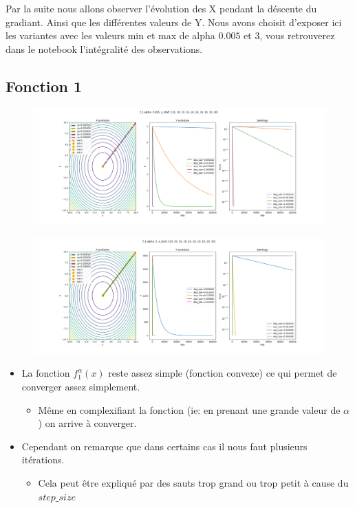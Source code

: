 \documentclass[twoside,10pt,a4paper]{article}
\numberwithin{equation}{section}					%
\numberwithin{figure}{section}						%
\begin{document}
Par la suite nous allons observer l'évolution des X pendant la déscente du gradiant. Ainsi que les différentes valeurs de Y.
Nous avons choisit d'exposer ici les variantes avec les valeurs min et max de alpha $0.005$ et $3$, vous retrouverez dans le notebook l'intégralité des observations.

\subsection{Fonction 1 }\label{sec:subsection2}
\begin{figure}[H]
    \centering
    \includegraphics[width=\textwidth]{imgs/fixed_sz/f_1_a-0.005_fixed_sz.png}
    \caption{}
\end{figure}
\begin{figure}[H]
    \centering
    \includegraphics[width=\textwidth]{imgs/fixed_sz/f_1_a-3_fixed_sz.png}
    \caption{}
\end{figure}
\begin{itemize}
	\item La fonction $f_1^{\alpha}(x)$ reste assez simple (fonction convexe) ce qui permet de converger assez simplement.
	\begin{itemize}
    	\item Même en complexifiant la fonction (ie: en prenant une grande valeur de $\alpha$) on arrive à converger.
	\end{itemize}
	\item Cependant on remarque que dans certains cas il nous faut plusieurs itérations.
	\begin{itemize}
    	\item Cela peut être expliqué par des sauts trop grand ou trop petit à cause du $step\_size$
	\end{itemize}
\end{itemize}
\end{document}
